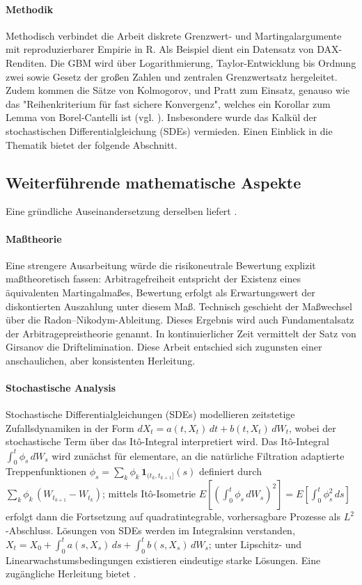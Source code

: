 \paragraph{Methodik}
Methodisch verbindet die Arbeit diskrete Grenzwert- und Martingalargumente mit 
reproduzierbarer Empirie in R. Als Beispiel dient ein Datensatz von DAX-Renditen.
Die GBM wird über Logarithmierung, Taylor-Entwicklung bis Ordnung zwei sowie Gesetz der großen Zahlen und 
zentralen Grenzwertsatz hergeleitet. Zudem kommen die Sätze von Kolmogorov, und Pratt zum Einsatz, 
genauso wie das "Reihenkriterium für fast sichere Konvergenz", welches 
ein Korollar zum Lemma von Borel-Cantelli ist (vgl. \cite{henze}). Insbesondere wurde
das Kalkül der stochastischen Differentialgleichung (SDEs) vermieden. Einen Einblick in die Thematik bietet der
folgende Abschnitt.

\subsection{Weiterführende mathematische Aspekte}
Eine gründliche Auseinandersetzung derselben liefert \cite{shreve}.

\paragraph{Maßtheorie}
Eine strengere Ausarbeitung würde die risikoneutrale Bewertung explizit maßtheoretisch fassen: 
Arbitragefreiheit entspricht der Existenz eines äquivalenten Martingalmaßes, Bewertung erfolgt als 
Erwartungswert der diskontierten Auszahlung unter diesem Maß. Technisch geschieht der 
Maßwechsel über die Radon–Nikodym-Ableitung. Dieses Ergebnis wird auch Fundamentalsatz der Arbitragepreistheorie genannt. 
In kontinuierlicher Zeit vermittelt der Satz von Girsanov die Driftelimination. Diese Arbeit entschied sich zugunsten einer anschaulichen, aber 
konsistenten Herleitung.

\paragraph{Stochastische Analysis}
Stochastische Differentialgleichungen (SDEs) modellieren zeitstetige Zufallsdynamiken in der 
Form $dX_t = a(t,X_t)\,dt + b(t,X_t)\,dW_t$, wobei der stochastische Term über das It\^o-Integral interpretiert wird.
Das It\^o-Integral $\int_0^t \phi_s\,dW_s$ wird zunächst für elementare, an die natürliche Filtration adaptierte 
Treppenfunktionen $\phi_s = \sum_k \phi_k\,\mathbf{1}_{(t_k,t_{k+1}]}(s)$ definiert durch $\sum_k \phi_k\,(W_{t_{k+1}}-W_{t_k})$; 
mittels It\^o-Isometrie $E\!\left[\left(\int_0^t \phi_s\,dW_s\right)^2\right] = E\!\left[\int_0^t \phi_s^2\,ds\right]$ erfolgt dann die 
Fortsetzung auf quadratintegrable, vorhersagbare Prozesse als $L^2$-Abschluss. Lösungen von SDEs werden im Integralsinn 
verstanden, $X_t = X_0 + \int_0^t a(s,X_s)\,ds + \int_0^t b(s,X_s)\,dW_s$; 
unter Lipschitz- und Linearwachstumsbedingungen existieren eindeutige starke Lösungen. Eine zugängliche
Herleitung bietet \cite{behrends}.


